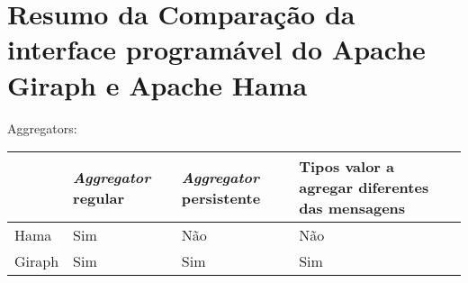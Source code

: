 \section{Resumo da Comparação da interface programável do Apache Giraph e Apache Hama}

Aggregators:
\begin{table}[H]
 \begin{tabular}{|| l | l | l | l |}\hline
  & \textit{Aggregator} regular & \textit{Aggregator} persistente & Tipos valor a agregar diferentes das mensagens\\\hline
  Hama & Sim & Não & Não \\\hline
  Giraph & Sim & Sim & Sim \\\hline
 \end{tabular}

 
 
\end{table}
